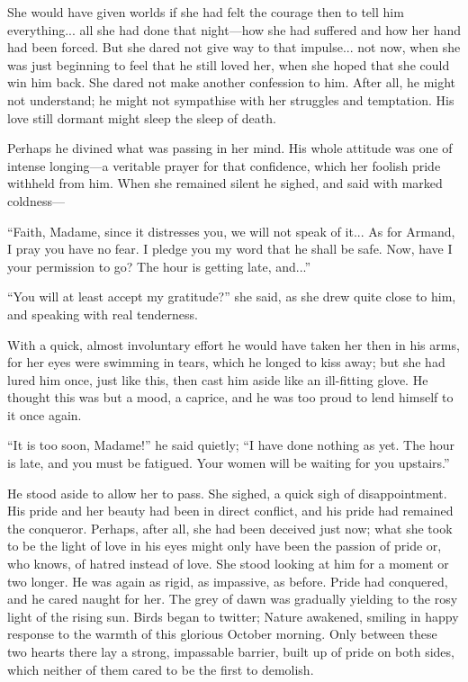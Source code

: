 \documentclass[paper=5.5in:8.5in,BCOR=7mm,twoside,DIV=calc,12pt,usegeometry,chapterprefix,endperiod,headings=big]{scrbook}
\begin{document}
She would have given worlds if she had felt the courage then to tell him everything... all she had done that night---how she had suffered and how her hand had been forced. But she dared not give way to that impulse... not now, when she was just beginning to feel that he still loved her, when she hoped that she could win him back. She dared not make another confession to him. After all, he might not understand; he might not sympathise with her struggles and temptation. His love still dormant might sleep the sleep of death.

Perhaps he divined what was passing in her mind. His whole attitude was one of intense longing---a veritable prayer for that confidence, which her foolish pride withheld from him. When she remained silent he sighed, and said with marked coldness---

\enquote{Faith, Madame, since it distresses you, we will not speak of it... As for Armand, I pray you have no fear. I pledge you my word that he shall be safe. Now, have I your permission to go? The hour is getting late, and...}

\enquote{You will at least accept my gratitude?} she said, as she drew quite close to him, and speaking with real tenderness.

With a quick, almost involuntary effort he would have taken her then in his arms, for her eyes were swimming in tears, which he longed to kiss away; but she had lured him once, just like this, then cast him aside like an ill-fitting glove. He thought this was but a mood, a caprice, and he was too proud to lend himself to it once again.

\enquote{It is too soon, Madame!} he said quietly; \enquote{I have done nothing as yet. The hour is late, and you must be fatigued. Your women will be waiting for you upstairs.}

He stood aside to allow her to pass. She sighed, a quick sigh of disappointment. His pride and her beauty had been in direct conflict, and his pride had remained the conqueror. Perhaps, after all, she had been deceived just now; what she took to be the light of love in his eyes might only have been the passion of pride or, who knows, of hatred instead of love. She stood looking at him for a moment or two longer. He was again as rigid, as impassive, as before. Pride had conquered, and he cared naught for her. The grey of dawn was gradually yielding to the rosy light of the rising sun. Birds began to twitter; Nature awakened, smiling in happy response to the warmth of this glorious October morning. Only between these two hearts there lay a strong, impassable barrier, built up of pride on both sides, which neither of them cared to be the first to demolish.
\end{document}
